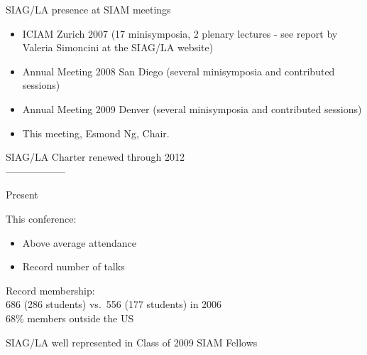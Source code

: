 \documentclass[]{seminar}
\begin{document}
{\begin{slide}
\end{slide}
\begin{slide}

\begin{center}
{\color{blue}
SIAG/LA presence at SIAM meetings
}
\end{center}
\vspace*{2mm}

\begin{itemize}
\item
ICIAM Zurich 2007
(17 minisymposia, 2 plenary lectures - see report by Valeria Simoncini
at the SIAG/LA website)
\item
Annual Meeting 2008 San Diego
(several minisymposia and contributed sessions)
\item
Annual Meeting 2009 Denver
(several minisymposia and contributed sessions)
\item This meeting, Esmond Ng, Chair.
\end{itemize}

\end{slide}
\begin{slide}

\begin{center}
SIAG/LA Charter renewed through 2012
\\
------------------
\end{center}

\vspace*{3mm}

\begin{center}
{\color{red}
Present
}
\end{center}


This conference:
\begin{itemize} \item Above average attendance
\item
Record number of talks
\end{itemize}

Record membership: 
\\
686 (286 students) vs.\ 
556 (177 students) in 2006
\\ 68\% members outside the US

\end{slide}
\begin{slide}

\begin{center}
{\color{blue}
SIAG/LA well represented in Class of 2009 SIAM Fellows
}
\end{center}


\end{slide}}
\end{document}
